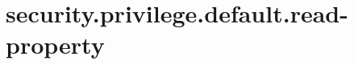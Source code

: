 \section{security.privilege.default.read-property}
\label{configuration:SecurityPrivilegeDefaultReadProperty}
\AvailableInJavaOnly{\TODO}
